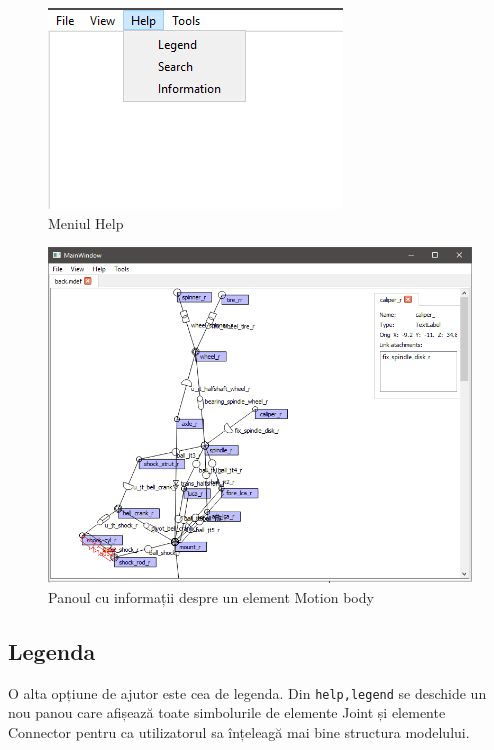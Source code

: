 \begin{figure}[H]
    \begin{center}
    \includegraphics[scale=0.5]{imagini/implementare/helpmenu.png}
    \end{center}
    \caption{Meniul Help}
    \label{fig:tabs}
\end{figure}

\begin{figure}[H]
    \includegraphics[width=\linewidth]{imagini/implementare/info.png}
    \caption{Panoul cu informații despre un element Motion body}
    \label{fig:tabs}
\end{figure}

\subsection{Legenda}
O alta opțiune de ajutor este cea de legenda. 
Din \verb|help,legend| se deschide un nou panou care afișează toate simbolurile de elemente Joint și elemente Connector pentru ca 
utilizatorul sa înțeleagă mai bine structura modelului.\newline 

